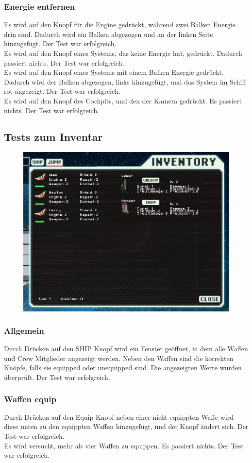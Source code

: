 \documentclass[fontsize=12pt,paper=a4,twoside]{scrartcl}
\begin{document}
\subsubsection{Energie entfernen}
Es wird auf den Knopf für die Engine gedrückt, während zwei Balken Energie drin sind. Dadurch wird ein Balken abgezogen und an der linken Seite hinzugefügt. Der Test war erfolgreich. \\
Es wird auf den Knopf eines Systems, das keine Energie hat, gedrückt. Dadurch passiert nichts. Der Test war erfolgreich. \\
Es wird auf den Knopf eines Systems mit einem Balken Energie gedrückt. Dadurch wird der Balken abgezogen, links hinzugefügt, und das System im Schiff rot angezeigt. Der Test war erfolgreich. \\
Es wird auf den Knopf des Cockpits, und  den der Kamera gedrückt. Es passiert nichts. Der Test war erfolgreich.  \\



\subsection{Tests zum Inventar}
\begin{figure}[h!]
\centering
\includegraphics[width=0.5\linewidth]{images/inventory1.png}
\end{figure}
\subsubsection{Allgemein}
Durch Drücken auf den SHIP Knopf wird ein Fenster geöffnet, in dem alle Waffen und Crew Mitglieder angezeigt werden. Neben den Waffen sind die korrekten Knöpfe, falls sie equipped oder unequipped sind. Die angezeigten Werte wurden überprüft. Der Test war erfolgreich. \\
\subsubsection{Waffen equip}
Durch Drücken auf den Equip Knopf neben einer nicht equippten Waffe wird diese unten zu den equippten Waffen hinzugefügt, und der Knopf ändert sich. Der Test war erfolgreich. \\
Es wird versucht, mehr als vier Waffen zu equippen. Es passiert nichts. Der Test war erfolgreich. \\
\end{document}
